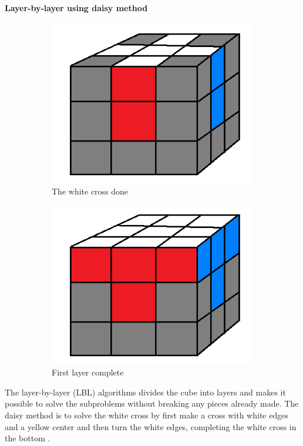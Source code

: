 \documentclass[a4paper,11pt]{kth-mag}
\begin{document}
\paragraph{Layer-by-layer using daisy method}
\begin{figure}[b]
	\centering
	\begin{subfigure}[!b]{0.3\textwidth}
		\includegraphics[width=\textwidth]{figs/step1.png}
		\caption{The white cross done}
		\label{fig_4}
	\end{subfigure}
	\begin{subfigure}[!b]{0.3\textwidth}
		\includegraphics[width=\textwidth]{figs/step2.png}
		\caption{First layer complete}
		\label{fig_5}
	\end{subfigure}
	\caption{}
\end{figure}
The layer-by-layer (LBL) algorithms divides the cube into layers and makes it possible to solve the subproblems without breaking any pieces already made. 
The daisy method is to solve the white cross by first make a cross with white edges and a yellow center and then turn the white edges, completing the white cross in the bottom \cite{Shellie}.
\end{document}

